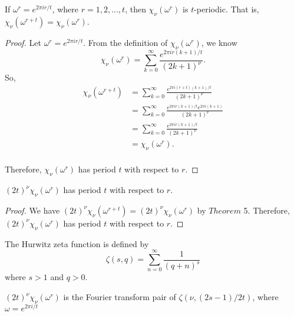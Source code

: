 \documentclass[../article.tex]{subfiles}
\begin{document}
\begin{theorem}
If $\omega^r = e^{2\pi i r/t}$, where $r=1,2,...,t$, then $\chi_{\nu}(\omega^r)$ is $t$-periodic. That is, $\chi_{\nu}(\omega^{r+t}) = \chi_{\nu}(\omega^r)$.
\end{theorem}

\begin{proof}
Let $\omega^r = e^{2\pi i r/t}$. From the definition of $\chi_{\nu}(\omega^r)$, we know
\begin{equation}
\chi_{\nu}(\omega^{r}) = \sum_{k=0}^{\infty} \frac{e^{2 \pi i r(k+1)/t}}{(2k+1)^{\nu}}.
\end{equation}
So,
\begin{equation}
\begin{split}
\chi_{\nu}(\omega^{r+t}) &= \sum_{k=0}^{\infty} \frac{e^{2 \pi i (r+t)(k+1)/t}}{(2k+1)^{\nu}} \\
&= \sum_{k=0}^{\infty} \frac{e^{2 \pi i r(k+1)/t}e^{2 \pi i(k+1)}}{(2k+1)^{\nu}} \\
&= \sum_{k=0}^{\infty} \frac{e^{2 \pi i r(k+1)/t}}{(2k+1)^{\nu}} \\
&= \chi_{\nu}(\omega^r).\\
\end{split}
\end{equation}

Therefore, $\chi_{\nu}(\omega^r)$ has period $t$ with respect to $r$.
\end{proof}

\begin{corollary}
$(2t)^{\nu} \chi_{\nu}(\omega^r)$ has period $t$ with respect to $r$.
\end{corollary}

\begin{proof}
We have $(2t)^{\nu} \chi_{\nu}(\omega^{r+t}) = (2t)^{\nu} \chi_{\nu}(\omega^r)$ by $Theorem$ 5. Therefore, $(2t)^{\nu} \chi_{\nu}(\omega^r)$ has period $t$ with respect to $r$.
\end{proof}

\begin{definition}
The Hurwitz zeta function is defined by
\begin{equation}
\zeta(s,q) = \sum_{n=0}^{\infty} \frac{1}{(q+n)^s}
\end{equation}
where $s > 1$ and $q > 0$.
\end{definition}

\begin{theorem}
$(2t)^\nu \chi_{\nu}(\omega^{r})$ is the Fourier transform pair of $\zeta(\nu, (2s-1)/2t)$, where $\omega = e^{2\pi i/t}$
\end{theorem}
\end{document}
